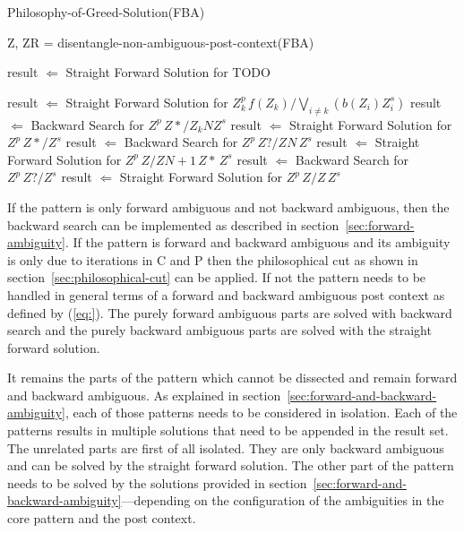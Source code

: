 \documentclass[acmtoplas]{acmtrans2m}
\newcommand{\eqref}[1]{(\ref{eq:#1})}
\newcommand{\secref}[1]{section~\ref{sec:#1}}
\begin{document}
\begin{algorithm}
\caption{Philosophy-of-Greed-Solution(FBA)}
\label{algo:disentanglement}
\begin{algorithmic}
    \STATE Z, ZR = disentangle-non-ambiguous-post-context(FBA)
    \STATE {}
    \STATE {}

    \STATE result $\Leftarrow$ Straight Forward Solution for TODO

        \STATE \COMMENT{According to pattern \eqref{}}
        \STATE result $\Leftarrow$ Straight Forward Solution for               
                $Z_k^p\,f(Z_k) / \bigvee_{i\neq k}( b(Z_i) Z_i^s)$ 
            \STATE {}
            \STATE result $\Leftarrow$ Backward Search for $Z^p \, Z*  / Z_k{N} Z^s$
            \STATE {}
            \STATE result $\Leftarrow$ Straight Forward Solution for $Z^p \, Z* / Z^s$
            \STATE {}
            \STATE result $\Leftarrow$ Backward Search for           $Z^p \, Z? / Z{N} \, Z^s$
            \STATE result $\Leftarrow$ Straight Forward Solution for $Z^p \, Z  / Z{N+1} \, Z* \, Z^s$
            \STATE {}
            \STATE result $\Leftarrow$ Backward Search for           $Z^p \, Z?  / Z^s$ 
            \STATE result $\Leftarrow$ Straight Forward Solution for $Z^p \, Z / Z \, Z^s$ 
        \ENDIF
    \ENDFOR
\end{algorithmic}
\end{algorithm}

If the pattern is only forward ambiguous and not backward ambiguous, then
the backward search can be implemented as described in \secref{forward-ambiguity}.
If the pattern is forward and backward ambiguous and its ambiguity is only due
to iterations in {\sf C} and {\sf P} then the philosophical cut as 
shown in \secref{philosophical-cut} can be applied. If not the pattern needs to be handled
in general terms of a forward and backward ambiguous post context as
defined by \eqref{}. The purely forward ambiguous parts are solved
with backward search and the purely backward ambiguous parts are solved
with the straight forward solution. 

It remains the parts of the pattern which cannot be dissected and remain forward and
backward ambiguous. As explained in \secref{forward-and-backward-ambiguity}, each of those patterns needs to
be considered in isolation. Each of the patterns results in multiple solutions
that need to be appended in the result set. The unrelated parts are first of
all isolated. They are only backward ambiguous and can be solved by the 
straight forward solution. The other part of the pattern needs to be solved
by the solutions provided in \secref{forward-and-backward-ambiguity}---depending on the configuration of the
ambiguities in the core pattern and the post context.
\end{document}
